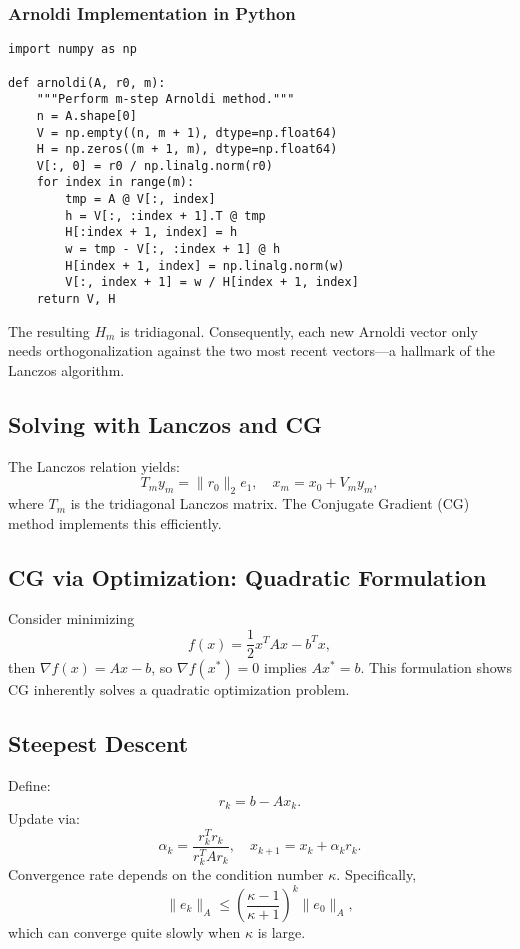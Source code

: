 \documentclass[11pt,a4paper]{book}
\begin{document}
\subsubsection*{Arnoldi Implementation in Python}
\begin{lstlisting}
import numpy as np

def arnoldi(A, r0, m):
    """Perform m-step Arnoldi method."""
    n = A.shape[0]
    V = np.empty((n, m + 1), dtype=np.float64)
    H = np.zeros((m + 1, m), dtype=np.float64)
    V[:, 0] = r0 / np.linalg.norm(r0)
    for index in range(m):
        tmp = A @ V[:, index]
        h = V[:, :index + 1].T @ tmp
        H[:index + 1, index] = h
        w = tmp - V[:, :index + 1] @ h
        H[index + 1, index] = np.linalg.norm(w)
        V[:, index + 1] = w / H[index + 1, index]
    return V, H
\end{lstlisting}

The resulting \(H_m\) is tridiagonal. Consequently, each new Arnoldi vector only needs orthogonalization against the two most recent vectors—a hallmark of the Lanczos algorithm.

\subsection*{Solving with Lanczos and CG}
The Lanczos relation yields:
\[
T_m y_m = \|r_0\|_2 e_1, \quad x_m = x_0 + V_m y_m,
\]
where \(T_m\) is the tridiagonal Lanczos matrix. The Conjugate Gradient (CG) method implements this efficiently.

\subsection*{CG via Optimization: Quadratic Formulation}
Consider minimizing
\[
f(x) = \frac{1}{2}x^T A x - b^T x,
\]
then \(\nabla f(x) = A x - b\), so \(\nabla f(x^*) = 0\) implies \(A x^* = b\). This formulation shows CG inherently solves a quadratic optimization problem.

\subsection*{Steepest Descent}
Define:
\[
r_k = b - A x_k.
\]
Update via:
\[
\alpha_k = \frac{r_k^T r_k}{r_k^T A r_k},\quad
x_{k+1} = x_k + \alpha_k r_k.
\]
Convergence rate depends on the condition number \(\kappa\). Specifically,
\[
\|e_k\|_A \le \left(\frac{\kappa - 1}{\kappa + 1}\right)^k \|e_0\|_A,
\]
which can converge quite slowly when \(\kappa\) is large.
\end{document}
